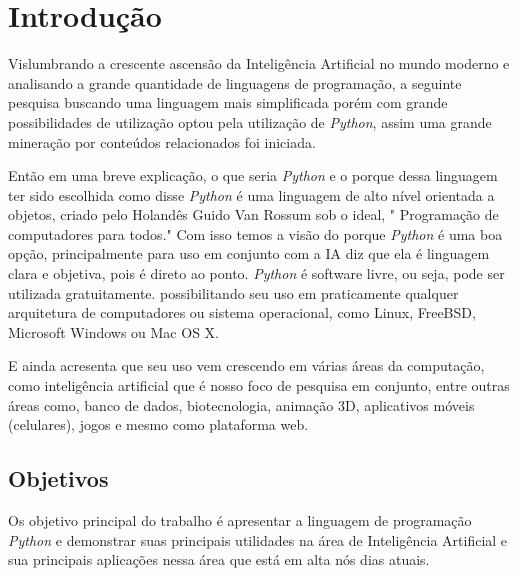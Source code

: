 \chapter*{Introdução}

Vislumbrando a crescente ascensão da Inteligência Artificial no mundo moderno e analisando a grande quantidade de linguagens de programação, a seguinte pesquisa buscando uma linguagem mais simplificada porém com grande possibilidades de utilização optou pela utilização de \textit{Python}, assim uma grande mineração por conteúdos relacionados foi iniciada.

Então em uma breve explicação, o que seria \textit{Python} e o porque dessa linguagem ter sido escolhida como disse \cite{pythonbasico2024} \textit{Python} é uma linguagem de alto nível orientada a objetos, criado pelo Holandês Guido Van Rossum sob o ideal, " Programação de computadores para todos." Com isso temos a visão do porque \textit{Python} é uma boa opção, principalmente para uso em conjunto com a IA \cite{menezes2010introduccao} diz que ela é linguagem clara e objetiva, pois é direto ao ponto. \textit{Python} é software livre, ou seja, pode ser utilizada gratuitamente. possibilitando seu uso em praticamente qualquer arquitetura de computadores ou sistema operacional, como Linux, FreeBSD, Microsoft Windows ou Mac OS X.

E ainda acresenta que seu uso vem crescendo em várias áreas da computação, como inteligência artificial que é nosso foco de pesquisa em conjunto, entre outras áreas como, banco de dados, biotecnologia, animação 3D, aplicativos móveis (celulares), jogos e mesmo como plataforma web.

\newpage
\section{Objetivos}
Os objetivo principal do trabalho é apresentar a linguagem de programação \textit{Python} e demonstrar suas principais utilidades na área de Inteligência Artificial e sua principais aplicações nessa área que está em alta nós dias atuais.

